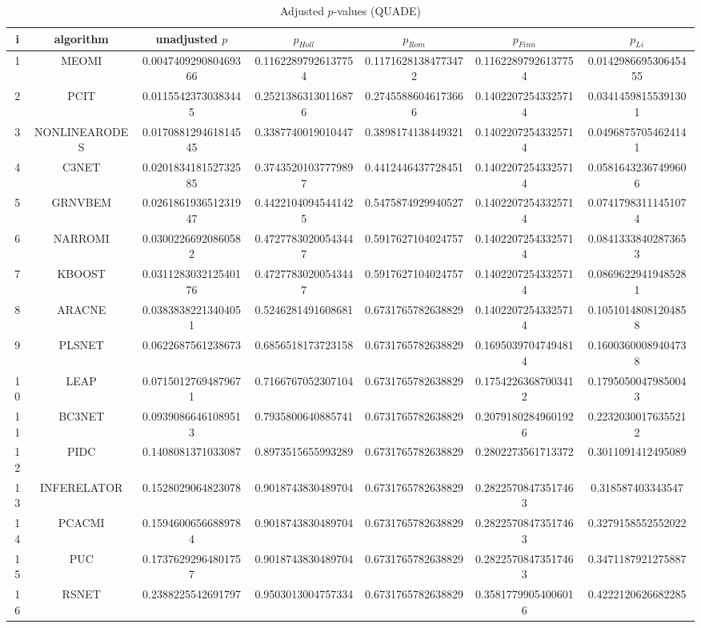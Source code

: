 \documentclass[a4paper,10pt]{article}
\begin{document}
\begin{landscape}
\begin{table}[!htp]
\centering\scriptsize
\caption{Adjusted $p$-values (QUADE)}
\begin{tabular}{ccccccc}
i&algorithm&unadjusted $p$&$p_{Holl}$&$p_{Rom}$&$p_{Finn}$&$p_{Li}$\\
\hline
1&MEOMI&0.004740929080469366&0.11622897926137754&0.11716281384773472&0.11622897926137754&0.014298669530645455\\
2&PCIT&0.01155423730383445&0.25213863130116876&0.27455886046173666&0.14022072543325714&0.03414598155391301\\
3&NONLINEARODES&0.017088129461814545&0.3387740019010447&0.3898174138449321&0.14022072543325714&0.04968757054624141\\
4&C3NET&0.020183418152732585&0.37435201037779897&0.4412446437728451&0.14022072543325714&0.05816432367499606\\
5&GRNVBEM&0.026186193651231947&0.44221040945441425&0.5475874929940527&0.14022072543325714&0.07417983111451074\\
6&NARROMI&0.03002266920860582&0.47277830200543447&0.5917627104024757&0.14022072543325714&0.08413338402873653\\
7&KBOOST&0.031128303212540176&0.47277830200543447&0.5917627104024757&0.14022072543325714&0.08696229419485281\\
8&ARACNE&0.03838382213404051&0.5246281491608681&0.6731765782638829&0.14022072543325714&0.10510148081204858\\
9&PLSNET&0.0622687561238673&0.6856518173723158&0.6731765782638829&0.16950397047494814&0.16003600089404738\\
10&LEAP&0.07150127694879671&0.7166767052307104&0.6731765782638829&0.17542263687003412&0.17950500479850043\\
11&BC3NET&0.09390866461089513&0.7935800640885741&0.6731765782638829&0.20791802849601926&0.22320300176355212\\
12&PIDC&0.1408081371033087&0.8973515655993289&0.6731765782638829&0.2802273561713372&0.3011091412495089\\
13&INFERELATOR&0.1528029064823078&0.9018743830489704&0.6731765782638829&0.28225708473517463&0.318587403343547\\
14&PCACMI&0.15946006566889784&0.9018743830489704&0.6731765782638829&0.28225708473517463&0.3279158552552022\\
15&PUC&0.17376292964801757&0.9018743830489704&0.6731765782638829&0.28225708473517463&0.3471187921275887\\
16&RSNET&0.2388225542691797&0.9503013004757334&0.6731765782638829&0.35817799054006016&0.4222120626682285\\

\end{tabular}
\end{table}
\end{landscape}
\end{document}
